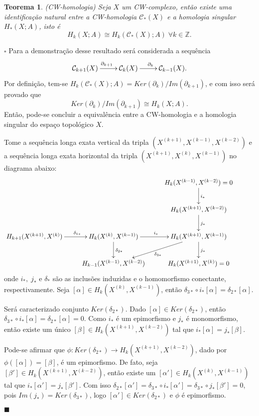 \documentclass[12pt]{book}
\newtheorem{teorema}{Teorema}[section]
\newenvironment{prova}[1]{$\square$ #1}{\hfill$\blacksquare$}
\newcommand{\classe}[1]{[#1]}
\newcommand{\homologia}[2]{H_{#1}(#2;A)}
\newcommand{\homologiarelskele}[3]{H_{#1}(X^{(#2)}, X^{(#3)})}
\newcommand{\homologiarelskelesimpl}[2]{H_{#1}(X^{(#2)}, X^{(#2-1)})}
\newcommand{\inteiros}{\mathbb{Z}}
\newcommand{\skeleton}[1]{X^{(#1)}}
\begin{document}
	\begin{teorema}\label{teorema_cw_homologia}
		(CW-homologia) Seja $X$ um CW-complexo, então existe uma identificação natural entre a CW-homologia $\mathcal{C}_{*}(X)$ e a homologia singular $\homologia{*}{X}$, isto é 
		$$
		\homologia{k}{X} \cong \homologia{k}{\mathcal{C}_{*}(X)}\; \forall k \in \inteiros.
		$$
	\end{teorema}
	\begin{prova}
		Para a demonstração desse resultado será considerada a sequência 
		$$
		\xymatrix{
			\mathcal{C}_{k+1}(X) \ar[r]^{\partial_{k+1}} & \mathcal{C}_{k}(X) \ar[r]^{\partial_{k}} & \mathcal{C}_{k-1}(X).
		}
		$$
		Por definição, tem-se $\homologia{k}{\mathcal{C}_{*}(X)} = Ker(\partial_{k})/Im(\partial_{k+1})$, e com isso será provado que 
		$$
		Ker(\partial_{k})/Im(\partial_{k+1}) \cong \homologia{k}{X}.
		$$ 
		Então, pode-se concluir a equivalência entre a CW-homologia e a homologia singular do espaço topológico $X$.
		
		Tome a sequência longa exata vertical da tripla $(\skeleton{k+1}, \skeleton{k-1}, \skeleton{k-2})$ e a sequência longa exata horizontal da tripla $(\skeleton{k+1}, \skeleton{k}, \skeleton{k-1})$  no diagrama abaixo:
		$$
		\xymatrix{
			& & \homologiarelskele{k}{k-1}{k-2}= 0 \ar[d]^{i_{*}} &
			\\
			& & \homologiarelskele{k}{k+1}{k-2} \ar[d]^{j_{*}} &
			\\
			\homologiarelskele{k+1}{k+1}{k} \ar[r]^{\quad\delta_{1*}} &		\homologiarelskele{k}{k}{k-1} \ar[r]^{i_{*}} \ar[d]^{\delta_{2*}} & \homologiarelskele{k}{k+1}{k-1} \ar[d]^{j_{*}} \ar[ld]^{\delta_{3*}} & 
			\\
			&  \homologiarelskele{k-1}{k-1}{k-2} & \homologiarelskele{k}{k+1}{k}=0&
		}
		$$
		onde $i_{*}, \; j_{*}$ e $\delta_{*}$ são as inclusões induzidas e o homomorfismo conectante, respectivamente. Seja $\classe{\alpha} \in \homologiarelskelesimpl{k}{k}$, então $\delta_{3*}\circ i_{*}\classe{\alpha} = \delta_{2*}\classe{\alpha}$.
		
		Será caracterizado conjunto $Ker(\delta_{2*})$. Dado $[\alpha] \in Ker(\delta_{2*})$, então $\delta_{3*}\circ i_{*}\classe{\alpha} = \delta_{2*}\classe{\alpha} = 0$. Como $i_{*}$ é um epimorfismo e $j_{*}$ é monomorfismo, então existe um único $\classe{\beta} \in \homologiarelskele{k}{k+1}{k-2}$ tal que $i_{*} \classe{\alpha} = j_{*} \classe{\beta}$. 
		
		Pode-se afirmar que $\phi: Ker(\delta_{2*}) \to \homologiarelskele{k}{k+1}{k-2}$, dado por $\phi(\classe{\alpha}) = \classe{\beta}$, é um epimorfismo. De fato, seja $\classe{\beta'} \in \homologiarelskele{k}{k+1}{k-2}$, então existe um $\classe{\alpha'} \in \homologiarelskele{k}{k}{k-1}$ tal que $i_{*} \classe{\alpha'} = j_{*} \classe{\beta'}$. Com isso $\delta_{2*}\classe{\alpha'} = \delta_{3*}\circ i_{*}\classe{\alpha'} = \delta_{3*}\circ j_{*}\classe{\beta'} = 0$, pois $Im(j_{*}) = Ker(\delta_{3*})$, logo $\classe{\alpha'} \in Ker(\delta_{2*})$ e $\phi$ é epimorfismo.
		

\end{prova}
\end{document}
